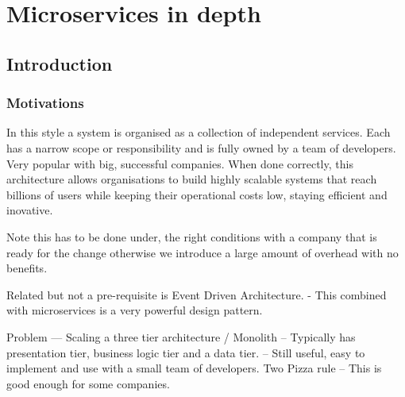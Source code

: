 \documentclass[a4paper, 11pt]{book}
\begin{document}
    \chapter{Microservices in depth}


    \section{Introduction}

    \subsection{Motivations}
    In this style a system is organised as a collection of independent services.
    Each has a narrow scope or responsibility and is fully owned by a team of developers.
    Very popular with big, successful companies.
    When done correctly, this architecture allows organisations to build highly scalable systems that reach billions of users while keeping their operational costs low, staying efficient and inovative.

    Note this has to be done under, the right conditions with a company that is ready for the change otherwise we introduce a large amount of overhead with no benefits.

    Related but not a pre-requisite is Event Driven Architecture.
    - This combined with microservices is a very powerful design pattern.

    Problem --- Scaling a three tier architecture / Monolith
    -- Typically has presentation tier, business logic tier and a data tier.
    -- Still useful, easy to implement and use with a small team of developers. Two Pizza rule %
    -- This is good enough for some companies.
\end{document}
